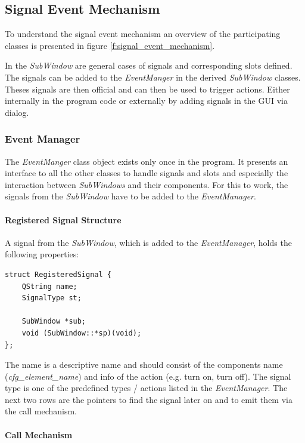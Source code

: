 \documentclass[10pt,a4paper]{article}
\begin{document}
\subsection{Signal Event Mechanism}

To understand the signal event mechanism an overview of the participating classes is presented in figure \ref{f:signal_event_mechanism}. 

\bigbreak

In the \textit{SubWindow} are general cases of signals and corresponding slots defined. The signals can be added to the \textit{EventManger} in the derived \textit{SubWindow} classes. Theses signals are then official and can then be used to trigger actions. Either internally in the program code or externally by adding signals in the GUI via dialog. 

	\subsubsection{Event Manager}
	
	The \textit{EventManger} class object exists only once in the program. It presents an interface to all the other classes to handle signals and slots and especially the interaction between \textit{SubWindows} and their components. For this to work, the signals from the \textit{SubWindow} have to be added to the \textit{EventManager}.
	
		\paragraph{Registered Signal Structure}

		A signal from the \textit{SubWindow}, which is added to the \textit{EventManager}, holds the following properties:
		
\begin{lstlisting}[caption=EventManager.h]
struct RegisteredSignal {
	QString name;
	SignalType st;

	SubWindow *sub;
	void (SubWindow::*sp)(void);
};
\end{lstlisting}

			The name is a descriptive name and should consist of the components name (\textit{cfg\_element\_name}) and info of the action (e.g. turn on, turn off). The signal type is one of the predefined types / actions listed in the \textit{EventManager}. The next two rows are the pointers to find the signal later on and to emit them via the call mechanism.

		\paragraph{Call Mechanism}
		
\end{document}
